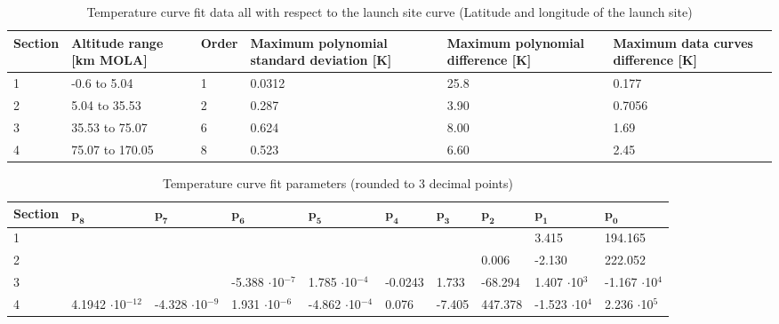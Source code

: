 \begin{table}[!ht]
\begin{center}
\caption{Temperature curve fit data all with respect to the launch site curve (Latitude and longitude of the launch site)}
\label{tab:fitDeviations}
\begin{tabular}{|l|l|l|p{3cm}|p{3cm}|p{3cm}|}
\hline 
\textbf{Section} & \textbf{Altitude range [km MOLA]} & \textbf{Order}	& \textbf{Maximum polynomial standard deviation [K]} & \textbf{Maximum polynomial difference [K]} & \textbf{Maximum data curves difference [K]} \\ \hline 
1 & -0.6 to 5.04 & 1 & 0.0312 & 25.8 & 0.177 \\ \hline
2 & 5.04 to 35.53 & 2 & 0.287 & 3.90 & 0.7056 \\ \hline
3 & 35.53 to 75.07 & 6 & 0.624 & 8.00 & 1.69 \\ \hline
4 & 75.07 to 170.05 & 8 & 0.523 & 6.60 & 2.45 \\ \hline
\end{tabular}
\end{center}
\end{table}

\begin{table}[!ht]
\begin{center}
\caption{Temperature curve fit parameters (rounded to 3 decimal points)}
\label{tab:fitParameters}
\begin{tabular}{|l||p{1.1cm}|p{1.1cm}|p{1.1cm}|p{1.1cm}|p{1.1cm}|p{1.1cm}|p{1.1cm}|p{1.1cm}|p{1.1cm}|}
\hline 
\textbf{Section}  & $\mathbf{p_{8}}$ & $\mathbf{p_{7}}$ & $\mathbf{p_{6}}$ & $\mathbf{p_{5}}$ & $\mathbf{p_{4}}$ & $\mathbf{p_{3}}$ & $\mathbf{p_{2}}$ & $\mathbf{p_{1}}$ & $\mathbf{p_{0}}$ \\ \hline 
1 &  &  &  &  &  &  & & 3.415 & 194.165   \\ \hline
2 &  &  &  &  &  & & 0.006 & -2.130 & 222.052   \\ \hline
3  &  &  & -5.388 $\cdot$10$^{-7}$ & 1.785 $\cdot$10$^{-4}$ & -0.0243 & 1.733 & -68.294 & 1.407 $\cdot$10$^{3}$ & -1.167 $\cdot$10$^{4}$ \\ \hline
4  & 4.1942 $\cdot$10$^{-12}$ & -4.328 $\cdot$10$^{-9}$ & 1.931 $\cdot$10$^{-6}$ & -4.862 $\cdot$10$^{-4}$ & 0.076 & -7.405 & 447.378 & -1.523 $\cdot$10$^{4}$ & 2.236 $\cdot$10$^{5}$ \\ \hline
\end{tabular}
\end{center}
\end{table}

